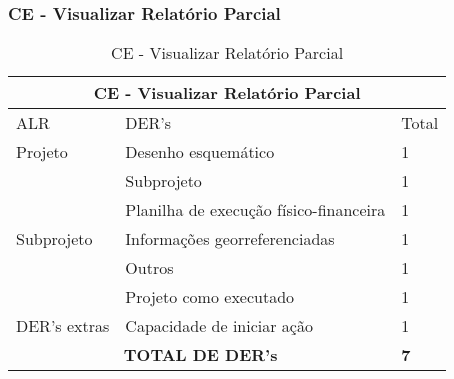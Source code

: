 \vfill
\pagebreak
  \subsubsection{CE - Visualizar Relatório Parcial}
  
  \begin{table}[!h]
\centering
\caption{CE - Visualizar Relatório Parcial}
\label{ce_visualizar_relatorio_parcial}
\begin{tabular}{|l|l|l|}
\hline
\multicolumn{3}{|c|}{CE - Visualizar Relatório Parcial}                                                                 \\ \hline
ALR                           & DER's                                                & Total              \\ \hline
		Projeto	      & Desenho esquemático                                  & 1                  \\ \hline
\multirow{5}{*}{Subprojeto}   & Subprojeto                                           & 1                  \\ \cline{2-3} 
                              & Planilha de execução físico-financeira               & 1                  \\ \cline{2-3} 
                              & Informações georreferenciadas                        & 1                  \\ \cline{2-3} 
                              & Outros                                               & 1                  \\ \cline{2-3} 
                              & Projeto como executado                               & 1                  \\ \hline
DER's extras		      & Capacidade de iniciar ação                           & 1 \\ \hline
\multicolumn{2}{|c|}{\textbf{TOTAL DE DER's}}                                                 & \textbf{7}                 \\ \hline
\end{tabular}
\end{table}




